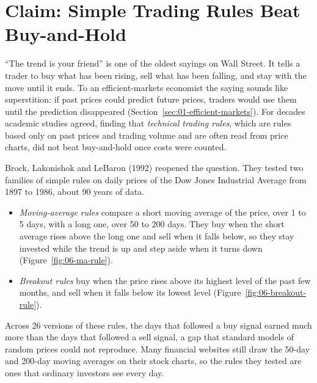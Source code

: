 \makeatletter
\makeatother

\chapter{Claim: Simple Trading Rules Beat Buy-and-Hold}
\label{ch:05}
\providecommand{\term}[1]{\emph{#1}}

``The trend is your friend'' is one of the oldest sayings on Wall Street. It tells a trader to buy what has been rising, sell what has been falling, and stay with the move until it ends. To an efficient-markets economist the saying sounds like superstition: if past prices could predict future prices, traders would use them until the prediction disappeared (Section~\ref{sec:01-efficient-markets}). For decades academic studies agreed, finding that \term{technical trading rules}, which are rules based only on past prices and trading volume and are often read from price charts, did not beat buy-and-hold once costs were counted. 

Brock, Lakonishok and LeBaron (1992) reopened the question. They tested two families of simple rules on daily prices of the Dow Jones Industrial Average from 1897 to 1986, about 90 years of data. 
\begin{itemize}
\item \term{Moving-average rules} compare a short moving average of the price, over 1 to 5 days, with a long one, over 50 to 200 days. They buy when the short average rises above the long one and sell when it falls below, so they stay invested while the trend is up and step aside when it turns down (Figure~\ref{fig:06-ma-rule}). 
\item \term{Breakout rules} buy when the price rises above its highest level of the past few months, and sell when it falls below its lowest level (Figure~\ref{fig:06-breakout-rule}).
\end{itemize}
Across 26 versions of these rules, the days that followed a buy signal earned much more than the days that followed a sell signal, a gap that standard models of random prices could not reproduce. Many financial websites still draw the 50-day and 200-day moving averages on their stock charts, so the rules they tested are ones that ordinary investors see every day.

